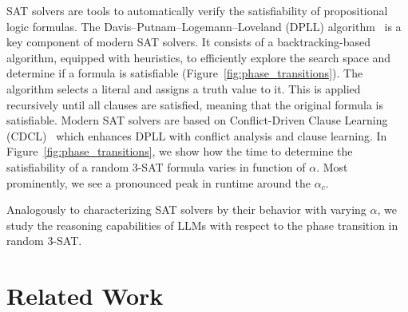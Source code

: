 \documentclass{article} %
\begin{document}
SAT solvers are tools to automatically verify the satisfiability of propositional logic formulas. The Davis–Putnam–Logemann–Loveland (DPLL) algorithm~\citep{davis1962machine} is a key component of modern SAT solvers. It consists of a backtracking-based algorithm, equipped with heuristics, to efficiently explore the search space and determine if a formula is satisfiable (Figure~\ref{fig:phase_transitions}). The algorithm selects a literal and assigns a truth value to it. This is applied recursively until all clauses are satisfied, meaning that the original formula is satisfiable. Modern SAT solvers are based on Conflict-Driven Clause Learning (CDCL)~\citep{cdcl} which enhances DPLL with conflict analysis and clause learning. In Figure~\ref{fig:phase_transitions}, we show how the time to determine the satisfiability of a random 3-SAT formula varies in function of $\alpha$. Most prominently, we see a pronounced peak in runtime around the $\alpha_c$.

Analogously to characterizing SAT solvers by their behavior with varying $\alpha$, we study the reasoning capabilities of LLMs with respect to the phase transition in random 3-SAT. 

\section{Related Work}
\end{document}

